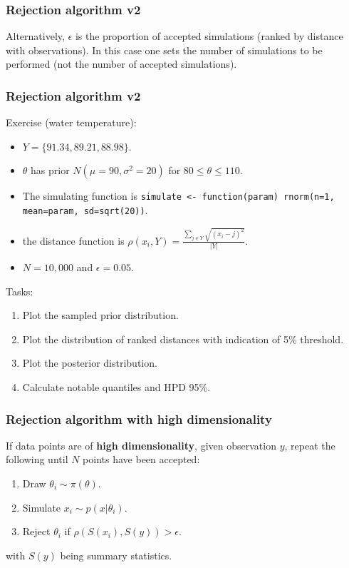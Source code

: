 \documentclass{beamer}
\newcommand{\1}{\ensuremath{\mathbf{1}}}
\begin{document}
%
%
%
\begin{frame}\frametitle{Rejection algorithm v2}
	Alternatively, $\epsilon$ is the proportion of accepted simulations (ranked by distance with observations). In this case one sets the number of simulations to be performed (not the number of accepted simulations).
\end{frame}
%
%
%
\begin{frame}\frametitle{Rejection algorithm v2}
	Exercise (water temperature):
	\begin{itemize}
		\item $Y = \{91.34, 89.21, 88.98\}$.
		\item $\theta$ has prior $N(\mu = 90, \sigma^2 = 20)$ for $80 \leq \theta \leq 110$.
		\item The simulating function is \texttt{simulate <- function(param) rnorm(n=1, mean=param, sd=sqrt(20))}.
		\item the distance function is $\rho(x_i,Y) = \tfrac{\sum_{j \in Y}\sqrt{(x_i - j)^2}}{|Y|}$.
		\item $N=10,000$ and $\epsilon=0.05$.
	\end{itemize}
	Tasks:
	\begin{enumerate}
		\item Plot the sampled prior distribution.
		\item Plot the distribution of ranked distances with indication of 5\% threshold.
		\item Plot the posterior distribution.
		\item Calculate notable quantiles and HPD 95\%.
	\end{enumerate}
\end{frame}
%
%
%
\begin{frame}\frametitle{Rejection algorithm with high dimensionality}
	If data points are of \textbf{high dimensionality}, given observation $y$, repeat the following until $N$ points have been accepted:
	\begin{enumerate}
		\item Draw $\theta_i \sim \pi(\theta)$.
		\item Simulate $x_i \sim p(x|\theta_i)$.
		\item Reject $\theta_i$ if $\rho(S(x_i), S(y)) > \epsilon$.
	\end{enumerate}
	with $S(y)$ being summary statistics.
\end{frame}
\end{document}
